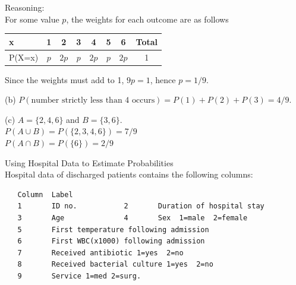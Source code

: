 \documentclass[bigtut]{tutorial}\usepackage[]{graphicx}\usepackage[]{color}
\makeatletter
\newcommand{\hlnum}[1]{\textcolor[rgb]{0.686,0.059,0.569}{#1}}%
\newcommand{\hlstr}[1]{\textcolor[rgb]{0.192,0.494,0.8}{#1}}%
\newcommand{\hlstd}[1]{\textcolor[rgb]{0.345,0.345,0.345}{#1}}%
\newcommand{\hlkwb}[1]{\textcolor[rgb]{0.69,0.353,0.396}{#1}}%
\newcommand{\hlkwc}[1]{\textcolor[rgb]{0.333,0.667,0.333}{#1}}%
\newcommand{\hlkwd}[1]{\textcolor[rgb]{0.737,0.353,0.396}{\textbf{#1}}}%
\newenvironment{kframe}{%
 \def\at@end@of@kframe{}%
 \ifinner\ifhmode%
  \def\at@end@of@kframe{\end{minipage}}%
  \begin{minipage}{\columnwidth}%
 \fi\fi%
 \def\FrameCommand##1{\hskip\@totalleftmargin \hskip-\fboxsep
 \colorbox{shadecolor}{##1}\hskip-\fboxsep
     \hskip-\linewidth \hskip-\@totalleftmargin \hskip\columnwidth}%
 \MakeFramed {\advance\hsize-\width
   \@totalleftmargin\z@ \linewidth\hsize
   \@setminipage}}%
 {\par\unskip\endMakeFramed%
 \at@end@of@kframe}
\newenvironment{knitrout}{}{} %
\makeatother
\begin{document}
\begin{tutorial}
\begin{questions}
\begin{solution}
\vspace{.5cm}
Reasoning:
\\
For some value $p$, the weights for each outcome are as follows \\
\begin{tabular}{|l|c|c|c|c|c|c| c|}
\hline
x & 1 & 2 & 3 & 4 & 5 & 6 & Total \\\hline
P(X=x) & $p$ & $2p$ & $p$ & $2p$ & $p$ & $2p$ & 1 \\ \hline
\end{tabular}

\vspace{.5cm}
Since the weights must add to 1, $9p=1$, hence $p=1/9$.

\vspace{.5cm}
(b)
$P(\text{number strictly less than 4 occurs}) = P(1) +P(2)+P(3) = 4/9$.
  
\vspace{.5cm}           
(c)
 $A = \{ 2,4,6 \}$ and $B = \{ 3,6 \}$. \\
 $P(A \cup B) = P(\{ 2,3,4,6 \}) = 7/9$ \\
 $P(A \cap B) = P(\{ 6 \}) = 2/9$ \\              
\end{solution}



\vspace{.5cm}
\question Using Hospital Data to Estimate Probabilities \\

Hospital data of discharged patients contains the following columns:
\begin{verbatim}
   Column  Label
   1       ID no.           2       Duration of hospital stay
   3       Age              4       Sex  1=male  2=female
   5       First temperature following admission
   6       First WBC(x1000) following admission
   7       Received antibiotic 1=yes  2=no
   8       Received bacterial culture 1=yes  2=no
   9       Service 1=med 2=surg.
\end{verbatim}

\vspace{.5cm}
\end{questions}
\end{tutorial}
\end{document}

